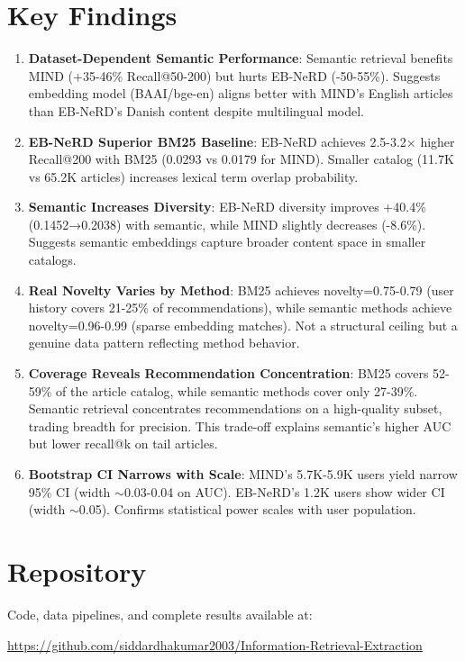 \documentclass[11pt,a4paper]{article}
\begin{document}
\section*{Key Findings}

\begin{enumerate}
    \item \textbf{Dataset-Dependent Semantic Performance}: Semantic retrieval benefits MIND (+35-46\% Recall@50-200) but hurts EB-NeRD (-50-55\%). Suggests embedding model (BAAI/bge-en) aligns better with MIND's English articles than EB-NeRD's Danish content despite multilingual model.

    \item \textbf{EB-NeRD Superior BM25 Baseline}: EB-NeRD achieves 2.5-3.2× higher Recall@200 with BM25 (0.0293 vs 0.0179 for MIND). Smaller catalog (11.7K vs 65.2K articles) increases lexical term overlap probability.

    \item \textbf{Semantic Increases Diversity}: EB-NeRD diversity improves +40.4\% (0.1452→0.2038) with semantic, while MIND slightly decreases (-8.6\%). Suggests semantic embeddings capture broader content space in smaller catalogs.

    \item \textbf{Real Novelty Varies by Method}: BM25 achieves novelty=0.75-0.79 (user history covers 21-25\% of recommendations), while semantic methods achieve novelty=0.96-0.99 (sparse embedding matches). Not a structural ceiling but a genuine data pattern reflecting method behavior.

    \item \textbf{Coverage Reveals Recommendation Concentration}: BM25 covers 52-59\% of the article catalog, while semantic methods cover only 27-39\%. Semantic retrieval concentrates recommendations on a high-quality subset, trading breadth for precision. This trade-off explains semantic's higher AUC but lower recall@k on tail articles.

    \item \textbf{Bootstrap CI Narrows with Scale}: MIND's 5.7K-5.9K users yield narrow 95\% CI (width $\sim$0.03-0.04 on AUC). EB-NeRD's 1.2K users show wider CI (width $\sim$0.05). Confirms statistical power scales with user population.
\end{enumerate}

\section*{Repository}

Code, data pipelines, and complete results available at:

\url{https://github.com/siddardhakumar2003/Information-Retrieval-Extraction}
\end{document}
